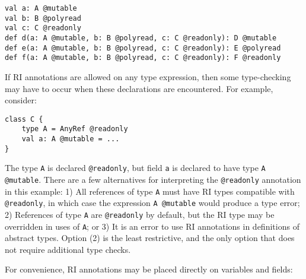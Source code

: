\documentclass[letterpaper,11pt]{article}
\newcommand{\code}[1]{\lstinline$#1$}
\theoremstyle{definition}
\theoremstyle{remark}
\begin{document}
\begin{lstlisting}
val a: A @mutable
val b: B @polyread
val c: C @readonly
def d(a: A @mutable, b: B @polyread, c: C @readonly): D @mutable
def e(a: A @mutable, b: B @polyread, c: C @readonly): E @polyread
def f(a: A @mutable, b: B @polyread, c: C @readonly): F @readonly
\end{lstlisting}

If RI annotations are allowed on any type expression, then
some type-checking may have to occur when these declarations are encountered.
For example, consider:
\begin{lstlisting}
class C {
	type A = AnyRef @readonly
	val a: A @mutable = ...
}
\end{lstlisting}
The type \code{A} is declared \code{@readonly},
but field \code{a} is declared to have type \code{A @mutable}.
There are a few alternatives for interpreting the \code{@readonly}
annotation in this example: 1) All references of type \code{A} must
have RI types compatible with \code{@readonly}, in which case
the expression \code{A @mutable} would produce a type error;
2) References of type \code{A} are \code{@readonly} by default, but
the RI type may be overridden in uses of \code{A}; or
3) It is an error to use RI annotations in definitions of abstract types.
Option (2) is the least restrictive, and the only option that does not
require additional type checks.



For convenience,
RI annotations may be placed directly on variables and fields:
\end{document}
